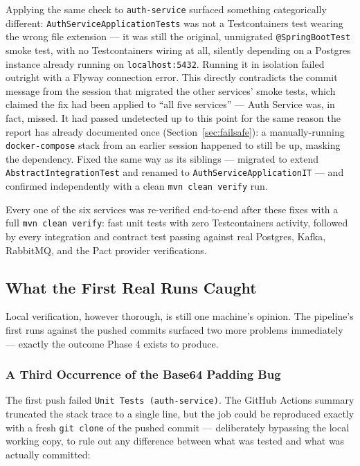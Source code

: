 Applying the same check to \texttt{auth-service} surfaced something categorically different: \texttt{AuthServiceApplicationTests} was not a Testcontainers test wearing the wrong file extension --- it was still the original, unmigrated \texttt{@SpringBootTest} smoke test, with no Testcontainers wiring at all, silently depending on a Postgres instance already running on \texttt{localhost:5432}. Running it in isolation failed outright with a Flyway connection error. This directly contradicts the commit message from the session that migrated the other services' smoke tests, which claimed the fix had been applied to ``all five services'' --- Auth Service was, in fact, missed. It had passed undetected up to this point for the same reason the report has already documented once (Section~\ref{sec:failsafe}): a manually-running \texttt{docker-compose} stack from an earlier session happened to still be up, masking the dependency. Fixed the same way as its siblings --- migrated to extend \texttt{AbstractIntegrationTest} and renamed to \texttt{AuthServiceApplicationIT} --- and confirmed independently with a clean \texttt{mvn clean verify} run.

\medskip
\noindent Every one of the six services was re-verified end-to-end after these fixes with a full \texttt{mvn clean verify}: fast unit tests with zero Testcontainers activity, followed by every integration and contract test passing against real Postgres, Kafka, RabbitMQ, and the Pact provider verifications.

\subsection{What the First Real Runs Caught}
\label{sec:ci-first-runs}

Local verification, however thorough, is still one machine's opinion. The pipeline's first runs against the pushed commits surfaced two more problems immediately --- exactly the outcome Phase 4 exists to produce.

\subsubsection{A Third Occurrence of the Base64 Padding Bug}

The first push failed \texttt{Unit Tests (auth-service)}. The GitHub Actions summary truncated the stack trace to a single line, but the job could be reproduced exactly with a fresh \texttt{git clone} of the pushed commit --- deliberately bypassing the local working copy, to rule out any difference between what was tested and what was actually committed:

